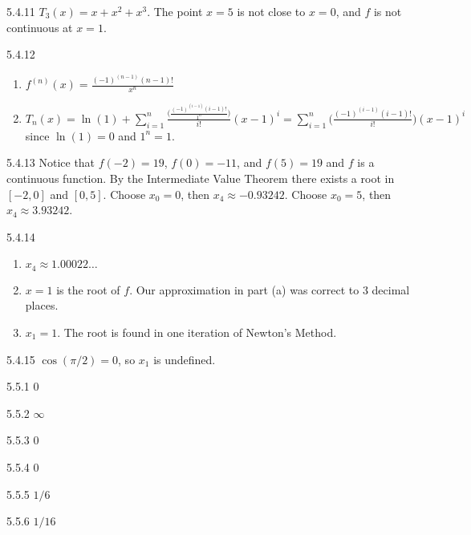 \begin{Answer}{5.4.11}
	$T_3(x)=x+x^2+x^3$. The point $x=5$ is not close to $x=0$, and $f$ is not continuous at $x=1$.
\end{Answer}
\begin{Answer}{5.4.12}
\begin{enumerate}
	\item	$f^{(n)}(x)=\frac{(-1)^{(n-1)}(n-1)!}{x^n}$
	\item	$T_n(x)=\ln (1)+\displaystyle\sum_{i=1}^{n} \frac{\big(\frac{(-1)^{(i-1)}(i-1)!}{1^n}\big)}{i!}(x-1)^i=\displaystyle\sum_{i=1}^{n} \bigg(\frac{(-1)^{(i-1)}(i-1)!}{i!}\bigg)(x-1)^i$ since $\ln (1)=0$ and $1^n=1$.
\end{enumerate}
\end{Answer}
\begin{Answer}{5.4.13}
	Notice that $f(-2)=19$, $f(0)=-11$, and $f(5)=19$ and $f$ is a continuous function. By the
	Intermediate Value Theorem there exists a root in $[-2,0]$ and $[0,5]$. Choose $x_0=0$, then $x_4\approx -0.93242$.
	Choose $x_0=5$, then $x_4\approx 3.93242$.
\end{Answer}
\begin{Answer}{5.4.14}
\begin{enumerate}
	\item	$x_4\approx 1.00022\ldots$
	\item	$x=1$ is the root of $f$. Our approximation in part (a) was correct to 3 decimal places.
	\item	$x_1=1$. The root is found in one iteration of Newton's Method.
\end{enumerate}
\end{Answer}
\begin{Answer}{5.4.15}
	$\cos (\pi/2)=0$, so $x_1$ is undefined.
\end{Answer}
\begin{Answer}{5.5.1}
 $0$
\end{Answer}
\begin{Answer}{5.5.2}
 $\infty$
\end{Answer}
\begin{Answer}{5.5.3}
 $0$
\end{Answer}
\begin{Answer}{5.5.4}
 $0$
\end{Answer}
\begin{Answer}{5.5.5}
 $1/6$
\end{Answer}
\begin{Answer}{5.5.6}
 $1/16$
\end{Answer}
